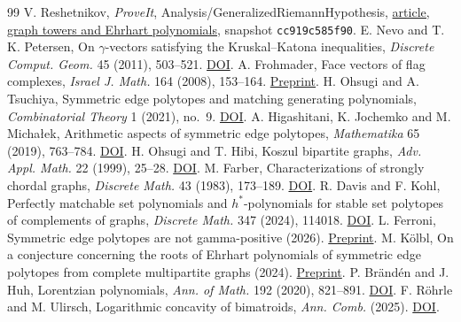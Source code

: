 \documentclass[11pt]{article}
\begin{document}
\small
\begin{thebibliography}{99}
 V. Reshetnikov, \emph{ProveIt}, Analysis/GeneralizedRiemannHypothesis, \href{https://github.com/VladimirReshetnikov/ProveIt/blob/cc919c585f90be8e0fba7a1b90c70afdea39998e/Analysis/GeneralizedRiemannHypothesis/Article/sections/gra.tex}{article, graph towers and Ehrhart polynomials}, snapshot \texttt{cc919c585f90}.
 E. Nevo and T. K. Petersen, On $\gamma$-vectors satisfying the Kruskal--Katona inequalities, \emph{Discrete Comput. Geom.} 45 (2011), 503--521. \href{https://doi.org/10.1007/s00454-010-9243-6}{DOI}.
 A. Frohmader, Face vectors of flag complexes, \emph{Israel J. Math.} 164 (2008), 153--164. \href{https://arxiv.org/abs/math/0605673}{Preprint}.
 H. Ohsugi and A. Tsuchiya, Symmetric edge polytopes and matching generating polynomials, \emph{Combinatorial Theory} 1 (2021), no.~9. \href{https://doi.org/10.5070/C61055371}{DOI}.
 A. Higashitani, K. Jochemko and M. Micha\l ek, Arithmetic aspects of symmetric edge polytopes, \emph{Mathematika} 65 (2019), 763--784. \href{https://doi.org/10.1112/S0025579319000147}{DOI}.
 H. Ohsugi and T. Hibi, Koszul bipartite graphs, \emph{Adv. Appl. Math.} 22 (1999), 25--28. \href{https://doi.org/10.1006/aama.1998.0615}{DOI}.
 M. Farber, Characterizations of strongly chordal graphs, \emph{Discrete Math.} 43 (1983), 173--189. \href{https://doi.org/10.1016/0012-365X(83)90154-1}{DOI}.
 R. Davis and F. Kohl, Perfectly matchable set polynomials and $h^*$-polynomials for stable set polytopes of complements of graphs, \emph{Discrete Math.} 347 (2024), 114018. \href{https://doi.org/10.1016/j.disc.2024.114018}{DOI}.
 L. Ferroni, Symmetric edge polytopes are not gamma-positive (2026). \href{https://arxiv.org/abs/2607.02424}{Preprint}.
 M. K\"olbl, On a conjecture concerning the roots of Ehrhart polynomials of symmetric edge polytopes from complete multipartite graphs (2024). \href{https://arxiv.org/abs/2404.02136}{Preprint}.
 P. Br\"and\'en and J. Huh, Lorentzian polynomials, \emph{Ann. of Math.} 192 (2020), 821--891. \href{https://doi.org/10.4007/annals.2020.192.3.4}{DOI}.
 F. R\"ohrle and M. Ulirsch, Logarithmic concavity of bimatroids, \emph{Ann. Comb.} (2025). \href{https://doi.org/10.1007/s00026-025-00780-z}{DOI}.
\end{thebibliography}
\end{document}
